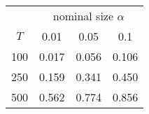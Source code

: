 % 
\begin{tabular}{cccc}
  \hline
  & \multicolumn{3}{c}{nominal size $\alpha$} \\
 $T$ & 0.01 & 0.05 & 0.1 \\
 \hline
100 & 0.017 & 0.056 & 0.106 \\ 
  250 & 0.159 & 0.341 & 0.450 \\ 
  500 & 0.562 & 0.774 & 0.856 \\ 
   \hline
\end{tabular}
